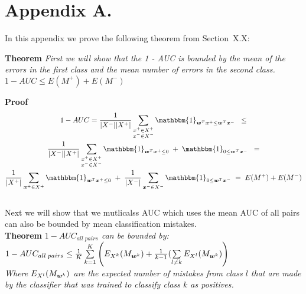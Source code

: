 
\section*{Appendix A.}
\label{app:theorem}



In this appendix we prove the following theorem from
Section~X.X:

\noindent

{\bf Theorem} {\it First we will show that the 1 - AUC is bounded by the mean 
of the errors in the first class and the mean number of errors in the second
class.  $1 - AUC \leq E(M^+) + E(M^-)$ 
}

{\bf Proof} 
\begin{multline}
1 - AUC = \frac{1}{|X^-| |X^+|} \sum\limits_{ \substack{x^+ \in X^+ \\ x^- \in X^-}} {  \mathbbm{1}_{\vw^T \vx^+ \leq \vw^T \vx^-} } \;\;\leq \\
\frac{1}{|X^-| |X^+|}  \sum\limits_{ \substack{x^+ \in X^+ \\ x^- \in X^-}} {  \mathbbm{1}_{\vw^T \vxp \leq 0} \;+\; \mathbbm{1}_{0 \leq \vw^T \vxn}  }  \;\;= \\
\frac{1}{|X^+|}  \sum\limits_{\vxp \in X^+}{  \mathbbm{1}_{\vw^T \vxp \leq 0} } \;+\; \frac{1}{|X^-|}  \sum\limits_{\vxn \in X^-}{\mathbbm{1}_{0 \leq \vw^T \vxn }  }   \;= \;
E(M^+) + E(M^-)
\end{multline}
\hfill\BlackBox \\


Next we will show that we mutlicalss AUC which uses the mean AUC of all pairs can also be bounded by mean classification mistakes.\\

{\bf Theorem} {\it $1 - AUC_{all \; pairs}$ can be bounded by: \\
 $1 - AUC_{all \; pairs} \leq \frac{1}{K}  \sum\limits_{k=1}^{K}  \left( E_{X^k}(M_{\bm{w}^k}) + \frac{1}{k-1} ( \sum\limits_{l \neq k}  E_{X^l}(M_{\bm{w}^k})  \right) $ 
\\ Where $E_{X^l}(M_{\bm{w}^k})$ are the expected number of mistakes from class $l$ that are made by the classifier that was trained to classify class $k$ as positives.}
\\

